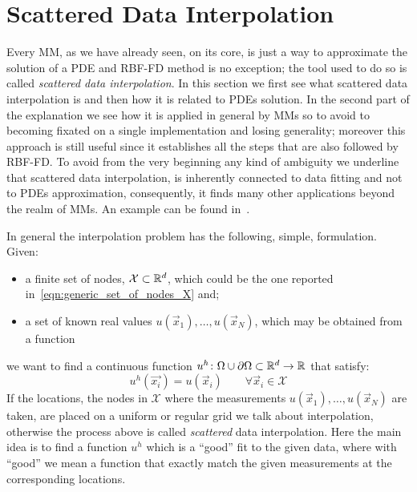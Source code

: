 
\section{Scattered Data Interpolation}
Every MM, as we have already seen, on its core, is just a way to approximate the solution of a PDE and RBF-FD method is no exception; the tool used to do so is called \emph{scattered data interpolation}. In this section we first see what scattered data interpolation is and then how it is related to PDEs solution. In the second part of the explanation we see how it is applied in general by MMs so to avoid to becoming fixated on a single implementation and losing generality; moreover this approach is still useful since it establishes all the steps that are also followed by RBF-FD.
To avoid from the very beginning any kind of ambiguity we underline that scattered data interpolation, is inherently connected to data fitting and not to PDEs approximation, consequently, it finds many other applications beyond the realm of MMs. An example can be found in~\cite{Amidror:scattered_data_interpolation_in_image_processing}.

In general the interpolation problem has the following, simple, formulation. Given:
\begin{itemize}
	\item a finite set of nodes,  $\mathcal{X} \subset \mathbb{R}^d$, which could be the one reported in~\eqref{eqn:generic_set_of_nodes_X} and;
	\item a set of known real values $u(\vec{x}_1), \dots, u(\vec{x}_N)$, which may be obtained from a function
\end{itemize}
we want to find a continuous function $u^{h} \colon \Omega\cup\partial\Omega\subset\mathbb{R}^{d} \to \mathbb{R}$ that satisfy:
\begin{equation}
	\label{eqn:interpolation_constraints}
	u^{h}(\vec{x_i}) = u(\vec{x}_i) \qquad  \forall \vec{x}_i \in \mathcal{X}
\end{equation}
If the locations, the nodes in $\mathcal{X}$ where the measurements $u(\vec{x}_1), \dots, u(\vec{x}_N)$ are taken, are placed on a uniform or regular grid we talk about interpolation, otherwise the process above is called \emph{scattered} data interpolation. Here the main idea is to find a function $u^h$ which is a ``good''  fit to the given data, where with ``good'' we mean a function that exactly match the given measurements at the corresponding locations.

